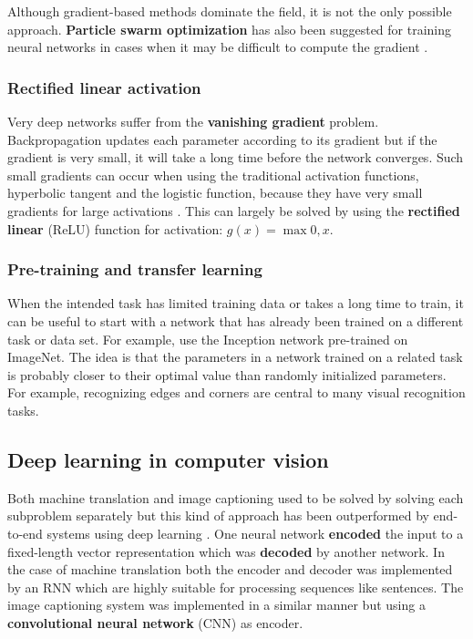 Although gradient-based methods dominate the field, it is not the only possible approach. \textbf{Particle swarm optimization} has also been suggested for training neural networks in cases when it may be difficult to compute the gradient \cite[Chapter~5]{StochasticOpt}.

\subsubsection{Rectified linear activation}

Very deep networks suffer from the \textbf{vanishing gradient} problem.
Backpropagation updates each parameter according to its gradient but if the gradient is very small, it will take a long time before the network converges.
Such small gradients can occur when using the traditional activation functions, hyperbolic tangent and the logistic function, because they have very small gradients for large activations \cite{AlexNet}.
This can largely be solved by using the \textbf{rectified linear} (ReLU) function for activation: $g(x) = \max {0, x}$.


\subsubsection{Pre-training and transfer learning}

When the intended task has limited training data or takes a long time to train, it can be useful to start with a network that has already been trained on a different task or data set.
For example, \cite{SpatialTransformerNetworks} use the Inception network pre-trained on ImageNet.
The idea is that the parameters in a network trained on a related task is probably closer to their optimal value than randomly initialized parameters. For example, recognizing edges and corners are central to many visual recognition tasks.


\subsection{Deep learning in computer vision}

Both machine translation and image captioning used to be solved by solving each subproblem separately but this kind of approach has been outperformed by end-to-end systems using deep learning \cite{ShowAndTell}. One neural network \textbf{encoded} the input to a fixed-length vector representation which was \textbf{decoded} by another network. In the case of machine translation both the encoder and decoder was implemented by an RNN which are highly suitable for processing sequences like sentences. The image captioning system was implemented in a similar manner but using a \textbf{convolutional neural network} (CNN) as encoder.


